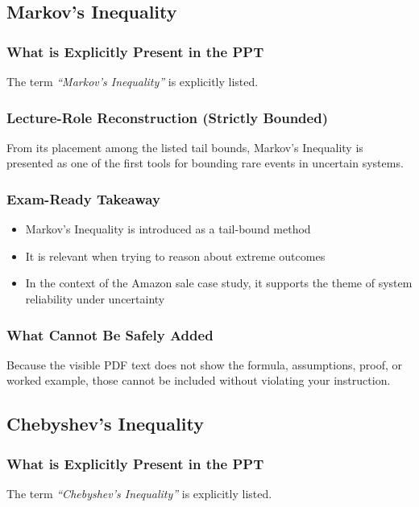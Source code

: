 \documentclass[11pt]{article}
\begin{document}
\subsection{Markov's Inequality}

\subsubsection*{What is Explicitly Present in the PPT}
The term \textit{``Markov's Inequality''} is explicitly listed.

\subsubsection*{Lecture-Role Reconstruction (Strictly Bounded)}
From its placement among the listed tail bounds, Markov's Inequality is presented as one of the first tools for bounding rare events in uncertain systems.

\subsubsection*{Exam-Ready Takeaway}
\begin{itemize}
    \item Markov's Inequality is introduced as a tail-bound method
    \item It is relevant when trying to reason about extreme outcomes
    \item In the context of the Amazon sale case study, it supports the theme of system reliability under uncertainty
\end{itemize}

\subsubsection*{What Cannot Be Safely Added}
Because the visible PDF text does not show the formula, assumptions, proof, or worked example, those cannot be included without violating your instruction.

\subsection{Chebyshev's Inequality}

\subsubsection*{What is Explicitly Present in the PPT}
The term \textit{``Chebyshev's Inequality''} is explicitly listed.
\end{document}
